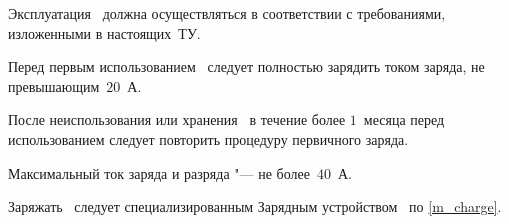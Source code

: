 \point
Эксплуатация \dut \ должна осуществляться в соответствии с требованиями, изложенными в настоящих~ТУ.

\point
Перед первым использованием \dut \ следует полностью зарядить током заряда, не превышающим~$20$~А. 

\point
После неиспользования или хранения \dut \ в течение более $1$~месяца перед использованием следует повторить процедуру первичного заряда.

\point
Максимальный ток заряда и разряда "--- не более~$40$~А. 

\point
Заряжать \dut \ следует специализированным Зарядным устройством \chargerRN \ по \ref{m_charge}.